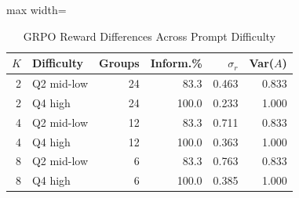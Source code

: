 \begin{table}[!htbp]
\centering

\scriptsize
\setlength{\tabcolsep}{3.4pt}
\begin{adjustbox}{max width=\linewidth}
\begin{tabular}{rlrrrr}
\toprule
$K$ & Difficulty & Groups & Inform.\% & $\sigma_r$ & Var($A$) \\
\midrule
2 & Q2 mid-low & 24 & 83.3 & 0.463 & 0.833 \\
2 & Q4 high & 24 & 100.0 & 0.233 & 1.000 \\
4 & Q2 mid-low & 12 & 83.3 & 0.711 & 0.833 \\
4 & Q4 high & 12 & 100.0 & 0.363 & 1.000 \\
8 & Q2 mid-low & 6 & 83.3 & 0.763 & 0.833 \\
8 & Q4 high & 6 & 100.0 & 0.385 & 1.000 \\
\bottomrule
\end{tabular}

\end{adjustbox}
\caption{GRPO Reward Differences Across Prompt Difficulty}
\label{tab:grpo-difficulty}

\end{table}

